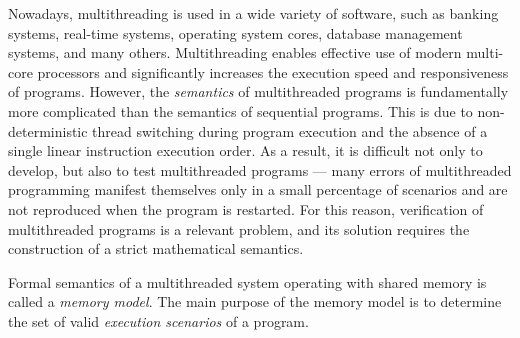 
{\actuality} 
Nowadays, multithreading is used in a wide variety of software, such as banking systems, real-time systems, operating system cores, database management systems, and many others. Multithreading enables effective use of modern multi-core processors and significantly increases the execution speed and responsiveness of programs. However, the \emph{semantics} of multithreaded programs is fundamentally more complicated than the semantics of sequential programs. This is due to non-deterministic thread switching during program execution and the absence of a single linear instruction execution order. As a result, it is difficult not only to develop, but also to test multithreaded programs  --- many errors of multithreaded programming manifest themselves only in a small percentage of scenarios and are not reproduced when the program is restarted. For this reason, verification of multithreaded programs is a relevant problem, and its solution requires the construction of a strict mathematical semantics.

Formal semantics of a multithreaded system operating with shared memory is called a \emph{memory model}.
The main purpose of the memory model is to determine the set of valid \emph{execution scenarios} of a program.

